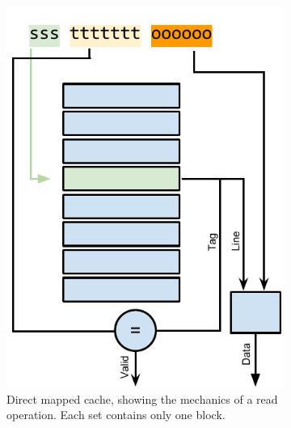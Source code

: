 \begin{figure}
    \centering
    \begin{subfigure}[b]{0.5\textwidth}
        \includegraphics[width=\textwidth]{figures/introduction/dircache_read}
        \caption{Direct mapped cache, showing the mechanics of a read operation. Each set contains only one block.}
        \label{fig:introduction:cache:dir}
    \end{subfigure}%
    \begin{subfigure}[b]{0.5\textwidth}

\end{subfigure}
\end{figure}
